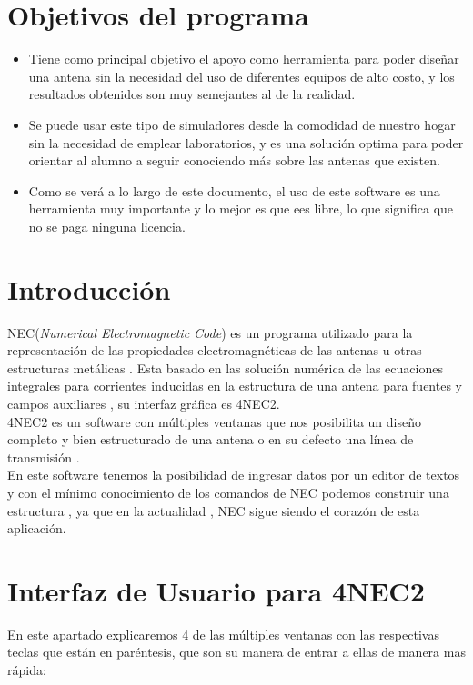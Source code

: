 \documentclass[11pt,a4paper]{article}
\begin{document}

\section{Objetivos del programa}
\begin{itemize}
    \item Tiene como principal objetivo el apoyo como herramienta para poder diseñar una antena sin la necesidad del uso de diferentes equipos de alto costo, y los resultados obtenidos son muy semejantes al de la realidad.
    \item Se puede usar este tipo de simuladores desde la comodidad de nuestro hogar sin la necesidad de emplear laboratorios, y es una soluci\'on optima para poder orientar al alumno a seguir conociendo m\'as sobre las antenas que existen.
    \item Como se ver\'a a lo largo de este documento, el uso de este software es una herramienta muy importante y lo mejor es que ees libre, lo que significa que no se paga ninguna licencia.
\end{itemize}


 \section{Introducci\'on}\label{sec:1}
 
 NEC(\textit{Numerical Electromagnetic Code}) es un programa utilizado para la representación de las propiedades electromagnéticas de las antenas u otras estructuras metálicas  \cite{ant} . Esta basado en las solución num\'erica de las ecuaciones integrales para corrientes inducidas en la estructura de una antena para fuentes y campos auxiliares \cite{moron} ,  su interfaz gr\'afica es 4NEC2.\\

4NEC2 es un software con m\'ultiples ventanas que nos posibilita un diseño completo y bien estructurado de una antena o en su defecto una l\'inea de transmisi\'on \cite{Gallardo} .\\

En este software tenemos la posibilidad de ingresar datos por un editor de textos y con el m\'inimo conocimiento de los comandos de NEC podemos construir una estructura \cite{Miron} ,  ya que en la actualidad , NEC sigue siendo el coraz\'on de esta aplicaci\'on.\\

\section{Interfaz de Usuario para 4NEC2}\label{sec:2}
En este apartado explicaremos 4 de las m\'ultiples ventanas con las respectivas teclas que están en par\'entesis, que son su manera de entrar a ellas de manera mas r\'apida:
\end{document}
